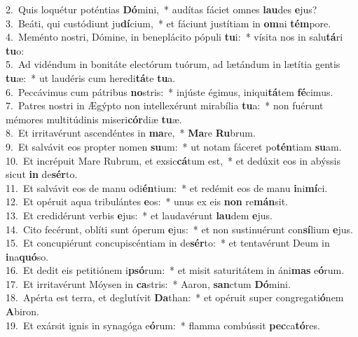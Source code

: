 {2.~}Quis loquétur poténtias \textbf{Dó}mini,~* audítas fáciet omnes \textbf{lau}des \textbf{e}jus?\\
{3.~}Beáti, qui custódiunt ju\textbf{dí}cium,~* et fáciunt justítiam in \textbf{om}ni \textbf{tém}pore.\\
{4.~}Meménto nostri, Dómine, in beneplácito pópuli \textbf{tu}i:~* vísita nos in salu\textbf{tá}ri \textbf{tu}o:\\
{5.~}Ad vidéndum in bonitáte electórum tuórum, ad lætándum in lætítia gentis \textbf{tu}æ:~* ut laudéris cum heredi\textbf{tá}te \textbf{tu}a.\\
{6.~}Peccávimus cum pátribus \textbf{no}stris:~* injúste égimus, iniqui\textbf{tá}tem \textbf{fé}cimus.\\
{7.~}Patres nostri in Ægýpto non intellexérunt mirabília \textbf{tu}a:~* non fuérunt mémores multitúdinis miseri\textbf{cór}diæ \textbf{tu}æ.\\
{8.~}Et irritavérunt ascendéntes in \textbf{ma}re,~* \textbf{Ma}re \textbf{Ru}brum.\\
{9.~}Et salvávit eos propter nomen \textbf{su}um:~* ut notam fáceret po\textbf{tén}tiam \textbf{su}am.\\
{10.~}Et incrépuit Mare Rubrum, et exsic\textbf{cá}tum est,~* et dedúxit eos in abýssis sicut \textbf{in} de\textbf{sér}to.\\
{11.~}Et salvávit eos de manu odi\textbf{én}tium:~* et redémit eos de manu \textbf{i}ni\textbf{mí}ci.\\
{12.~}Et opéruit aqua tribulántes \textbf{e}os:~* unus ex eis \textbf{non} re\textbf{mán}sit.\\
{13.~}Et credidérunt verbis \textbf{e}jus:~* et laudavérunt \textbf{lau}dem \textbf{e}jus.\\
{14.~}Cito fecérunt, oblíti sunt óperum \textbf{e}jus:~* et non sustinuérunt con\textbf{sí}lium \textbf{e}jus.\\
{15.~}Et concupiérunt concupiscéntiam in de\textbf{sér}to:~* et tentavérunt Deum in \textbf{i}na\textbf{quó}so.\\
{16.~}Et dedit eis petitiónem i\textbf{psó}rum:~* et misit saturitátem in áni\textbf{mas} e\textbf{ó}rum.\\
{17.~}Et irritavérunt Móysen in \textbf{ca}stris:~* Aaron, \textbf{san}ctum \textbf{Dó}mini.\\
{18.~}Apérta est terra, et deglutívit \textbf{Da}than:~* et opéruit super congregati\textbf{ó}nem \textbf{A}biron.\\
{19.~}Et exársit ignis in synagóga e\textbf{ó}rum:~* flamma combússit \textbf{pec}ca\textbf{tó}res.\\
